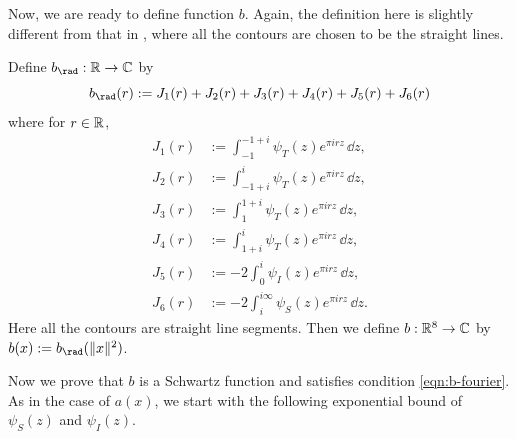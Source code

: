 Now, we are ready to define function $b$.
Again, the definition here is slightly different from that in \cite{Via2017}, where all the contours are chosen to be the straight lines.


\begin{definition}\label{def:b-definition}
Define $b_\rad : \R \to \C$ by
\begin{equation}
    \label{eqn:b-definition}
    b_\rad(r) := J_1(r) + J_2(r) + J_3(r) + J_4(r) + J_5(r) + J_6(r)
\end{equation}
where for $r \in \mathbb{R}$,
\begin{align}
    J_1(r) &:= \int_{-1}^{-1 + i} \psi_T(z) e^{\pi i r z} \, \dd z, \label{eqn:J1} \\
    J_2(r) &:= \int_{-1 + i}^{i} \psi_T(z) e^{\pi i r z} \, \dd z, \label{eqn:J2} \\
    J_3(r) &:= \int_{1}^{1 + i} \psi_T(z) e^{\pi i r z} \, \dd z, \label{eqn:J3} \\
    J_4(r) &:= \int_{1 + i}^{i} \psi_T(z) e^{\pi i r z} \, \dd z, \label{eqn:J4} \\
    J_5(r) &:= -2 \int_{0}^{i} \psi_I(z) e^{\pi i r z} \, \dd z, \label{eqn:J5} \\
    J_6(r) &:= -2 \int_{i}^{i \infty} \psi_S(z) e^{\pi i r z} \, \dd z. \label{eqn:J6}
\end{align}
Here all the contours are straight line segments.
Then we define $b : \mathbb{R}^8 \to \mathbb{C}$ by $b(x) := b_\rad(\|x\|^2)$.
\end{definition}

Now we prove that $b$ is a Schwartz function and satisfies condition \eqref{eqn:b-fourier}.
As in the case of $a(x)$, we start with the following exponential bound of $\psi_S(z)$ and $\psi_I(z)$.



